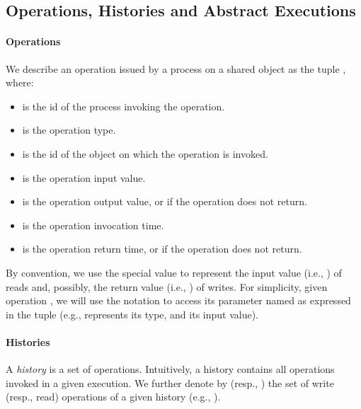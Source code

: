 \documentclass[letter, 11pt]{article}
\begin{document}
\subsection{Operations, Histories and Abstract Executions}

\paragraph{Operations}
We describe an operation issued by a process on a shared object as the tuple
, where:
\begin{itemize}
\item  is the id of the process invoking the operation.
\item  is the operation type.
\item  is the id of the object on which the operation is invoked.
\item  is the operation input value.
\item  is the operation output value, or  if the operation does not  return.
\item  is the operation invocation time.
\item  is the operation return time, or  if the operation does not  return.
\end{itemize}
By convention, we use the special value  to represent the input value (i.e., ) of reads
and, possibly, the return value (i.e., ) of writes.
For simplicity, given operation , we will use the notation  to access its parameter 
named  as expressed in the tuple (e.g.,  represents its type, and  its input value).


\paragraph{Histories}
A \emph{history}  is a set of operations. Intuitively, a history contains all operations invoked in a given execution. We further denote by  (resp., ) the set of write (resp., read) operations 
of a given history  (e.g., ).
\end{document}
